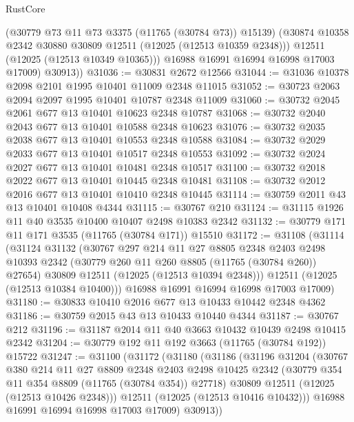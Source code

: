 \begin{lexlean}{RustCore}
\begin{coremodule}
            (@30779 @73 @11 @73 @3375 (@11765 (@30784 @73)) @15139)
            (@30874 @10358 @2342 @30880 @30809 @12511 (@12025 (@12513 @10359 @2348)))
            @12511
            (@12025 (@12513 @10349 @10365)))
          @16988
          @16991
          @16994
          @16998
          @17003
          @17009)
        @30913))
@31036 := @30831 @2672 @12566
@31044 := @31036 @10378 @2098 @2101 @1995 @10401 @11009 @2348 @11015
@31052 := @30723 @2063 @2094 @2097 @1995 @10401 @10787 @2348 @11009
@31060 := @30732 @2045 @2061 @677 @13 @10401 @10623 @2348 @10787
@31068 := @30732 @2040 @2043 @677 @13 @10401 @10588 @2348 @10623
@31076 := @30732 @2035 @2038 @677 @13 @10401 @10553 @2348 @10588
@31084 := @30732 @2029 @2033 @677 @13 @10401 @10517 @2348 @10553
@31092 := @30732 @2024 @2027 @677 @13 @10401 @10481 @2348 @10517
@31100 := @30732 @2018 @2022 @677 @13 @10401 @10445 @2348 @10481
@31108 := @30732 @2012 @2016 @677 @13 @10401 @10410 @2348 @10445
@31114 := @30759 @2011 @43 @13 @10401 @10408 @4344
@31115 := @30767 @210
@31124 := @31115 @1926 @11 @40 @3535 @10400 @10407 @2498 @10383 @2342
@31132 := @30779 @171 @11 @171 @3535 (@11765 (@30784 @171)) @15510
@31172 := @31108
    (@31114
      (@31124
        @31132
        (@30767
          @297
          @214
          @11
          @27
          @8805
          @2348
          @2403
          @2498
          @10393
          @2342
          (@30779 @260 @11 @260 @8805 (@11765 (@30784 @260)) @27654)
          @30809
          @12511
          (@12025 (@12513 @10394 @2348)))
        @12511
        (@12025 (@12513 @10384 @10400)))
      @16988
      @16991
      @16994
      @16998
      @17003
      @17009)
@31180 := @30833 @10410 @2016 @677 @13 @10433 @10442 @2348 @4362
@31186 := @30759 @2015 @43 @13 @10433 @10440 @4344
@31187 := @30767 @212
@31196 := @31187 @2014 @11 @40 @3663 @10432 @10439 @2498 @10415 @2342
@31204 := @30779 @192 @11 @192 @3663 (@11765 (@30784 @192)) @15722
@31247 := @31100
    (@31172
      (@31180
        (@31186
          (@31196
            @31204
            (@30767
              @380
              @214
              @11
              @27
              @8809
              @2348
              @2403
              @2498
              @10425
              @2342
              (@30779 @354 @11 @354 @8809 (@11765 (@30784 @354)) @27718)
              @30809
              @12511
              (@12025 (@12513 @10426 @2348)))
            @12511
            (@12025 (@12513 @10416 @10432)))
          @16988
          @16991
          @16994
          @16998
          @17003
          @17009)
        @30913))

\end{coremodule}
\end{lexlean}
